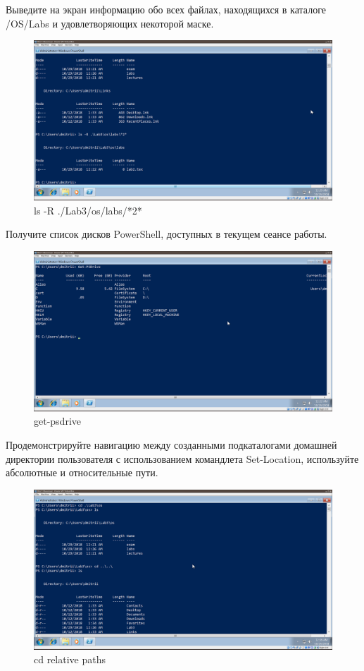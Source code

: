 \documentclass[a4paper]{article}
\begin{document}
Выведите на экран информацию обо всех файлах, находящихся в каталоге /OS/Labs и удовлетворяющих некоторой маске.

\begin{figure}[H]
    \centering
    \includegraphics[width=\linewidth]{9.png}
    \caption{ls -R ./Lab3/os/labs/*2*}
\end{figure}

Получите список дисков PowerShell, доступных в текущем сеансе работы.

\begin{figure}[H]
    \centering
    \includegraphics[width=\linewidth]{10.png}
    \caption{get-psdrive}
\end{figure}

Продемонстрируйте навигацию между созданными подкаталогами домашней директории пользователя с использованием командлета Set-Location, используйте абсолютные и относительные пути.

\begin{figure}[H]
    \centering
    \includegraphics[width=\linewidth]{11.png}
    \caption{cd relative paths}
\end{figure}
\end{document}
